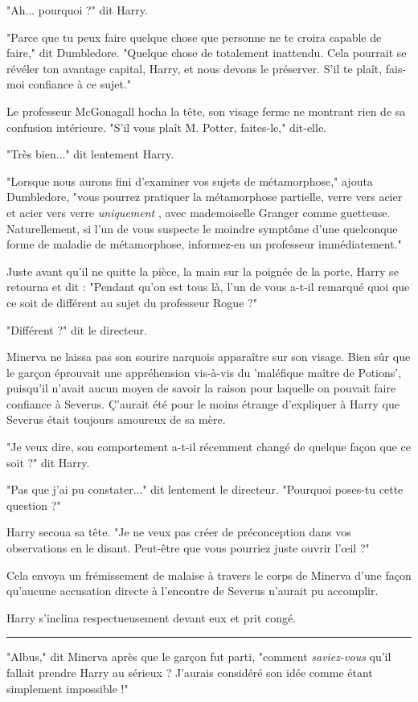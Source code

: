 "Ah... pourquoi ?" dit Harry.

"Parce que tu peux faire quelque chose que personne ne te croira capable de faire," dit Dumbledore. "Quelque chose de totalement inattendu. Cela pourrait se révéler ton avantage capital, Harry, et nous devons le préserver. S'il te plaît, fais-moi confiance à ce sujet."

Le professeur McGonagall hocha la tête, son visage ferme ne montrant rien de sa confusion intérieure. "S'il vous plaît M. Potter, faites-le," dit-elle.

"Très bien..." dit lentement Harry.

"Lorsque nous aurons fini d'examiner vos sujets de métamorphose," ajouta Dumbledore, "vous pourrez pratiquer la métamorphose partielle, verre vers acier et acier vers verre \emph{uniquement} , avec mademoiselle Granger comme guetteuse. Naturellement, si l'un de vous suspecte le moindre symptôme d'une quelconque forme de maladie de métamorphose, informez-en un professeur immédiatement."

Juste avant qu'il ne quitte la pièce, la main sur la poignée de la porte, Harry se retourna et dit : "Pendant qu'on est tous là, l'un de vous a-t-il remarqué quoi que ce soit de différent au sujet du professeur Rogue ?"

"Différent ?" dit le directeur.

Minerva ne laissa pas son sourire narquois apparaître sur son visage. Bien sûr que le garçon éprouvait une appréhension vis-à-vis du 'maléfique maître de Potions', puisqu'il n'avait aucun moyen de savoir la raison pour laquelle on pouvait faire confiance à Severus. Ç'aurait été pour le moins étrange d'expliquer à Harry que Severus était toujours amoureux de sa mère.

"Je veux dire, son comportement a-t-il récemment changé de quelque façon que ce soit ?" dit Harry.

"Pas que j'ai pu constater..." dit lentement le directeur. "Pourquoi poses-tu cette question ?"

Harry secoua sa tête. "Je ne veux pas créer de préconception dans vos observations en le disant. Peut-être que vous pourriez juste ouvrir l'œil ?"

Cela envoya un frémissement de malaise à travers le corps de Minerva d'une façon qu'aucune accusation directe à l'encontre de Severus n'aurait pu accomplir.

Harry s'inclina respectueusement devant eux et prit congé.
\par\noindent\rule{\textwidth}{0.4pt}
"Albus," dit Minerva après que le garçon fut parti, "comment \emph{saviez-vous}  qu'il fallait prendre Harry au sérieux ? J'aurais considéré son idée comme étant simplement impossible !"

